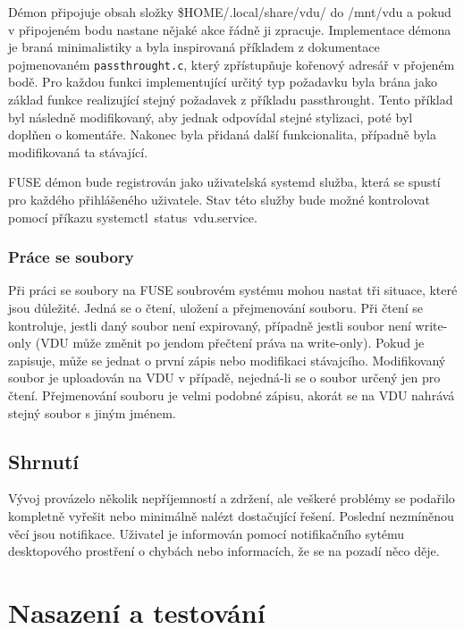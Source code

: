 Démon připojuje obsah složky \$HOME/.local/share/vdu/ do /mnt/vdu a pokud v připojeném bodu nastane nějaké akce řádně ji zpracuje. Implementace démona je braná minimalistiky
a byla inspirovaná příkladem z dokumentace pojmenovaném \texttt{passthrought.c}, který zpřístupňuje kořenový adresář v přojeném bodě. Pro každou funkci implementující
určitý typ požadavku byla brána jako základ funkce realizující stejný požadavek z příkladu passthrought. Tento příklad byl následně modifikovaný, aby jednak
odpovídal stejné stylizaci, poté byl doplňen o komentáře. Nakonec byla přidaná další funkcionalita, případně byla modifikovaná ta stávající.

FUSE démon bude registrován jako uživatelská systemd služba, která se spustí pro každého přihlášeného uživatele. Stav této služby bude možné kontrolovat pomocí příkazu
\mbox{systemctl status vdu.service}.

\subsection{Práce se soubory}

Při práci se soubory na FUSE soubrovém systému mohou nastat tři situace, které jsou důležité. Jedná se o čtení, uložení a přejmenování souboru. Při čtení
se kontroluje, jestli daný soubor není expirovaný, případně jestli soubor není write-only (VDU může změnit po jendom přečtení práva na write-only).
Pokud je zapisuje, může se jednat o první zápis nebo modifikaci stávajcího. Modifikovaný soubor je uploadován na VDU v případě, nejedná-li se o soubor určený
jen pro čtení. Přejmenování souboru je velmi podobné zápisu, akorát se na VDU nahrává stejný soubor s jiným jménem.

\section{Shrnutí}
Vývoj provázelo několik nepříjemností a zdržení, ale veškeré problémy se podařilo kompletně vyřešit nebo minimálně nalézt dostačující řešení. Poslední 
nezmíněnou věcí jsou notifikace. Uživatel je informován pomocí notifikačního sytému desktopového prostření o chybách nebo informacích, že se na pozadí něco děje.

\chapter{Nasazení a testování}

